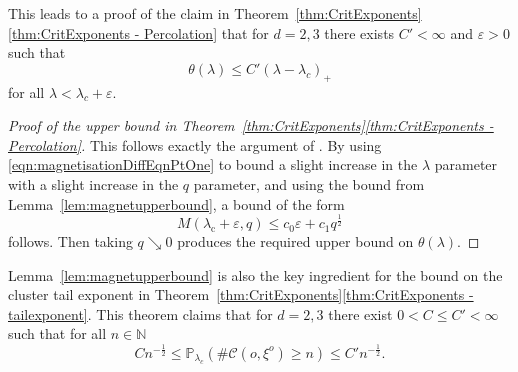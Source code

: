 \documentclass[10pt,a4paper,dvipsnames]{article}
\theoremstyle{definition}
\theoremstyle{remark}
\newcommand{\p}{\mathbb P}
\newcommand{\N}{\mathbb N}
\newcommand{\C}{\mathscr {C}}
\newcommand{\orig}{o}
\numberwithin{equation}{section}
\begin{document}
This leads to a proof of the claim in Theorem~\ref{thm:CritExponents}\ref{thm:CritExponents - Percolation} that for $d=2,3$ there exists $C'<\infty$ and $\varepsilon>0$ such that
\begin{equation}
    \theta\left(\lambda\right) \leq C'\left(\lambda-\lambda_c\right)_+
\end{equation}
for all $\lambda<\lambda_c+\varepsilon$.

\begin{proof}[Proof of the upper bound in Theorem~\ref{thm:CritExponents}\ref{thm:CritExponents - Percolation}]
    This follows exactly the argument of \cite[Section~4.2]{caicedo2023critical}. By using \eqref{eqn:magnetisationDiffEqnPtOne} to bound a slight increase in the $\lambda$ parameter with a slight increase in the $q$ parameter, and using the bound from Lemma~\ref{lem:magnetupperbound}, a bound of the form
    \begin{equation}
        M\left(\lambda_\mathrm{c}+\varepsilon,q\right) \leq c_0 \varepsilon + c_1q^\frac{1}{2}
    \end{equation}
    follows. Then taking $q\searrow 0$ produces the required upper bound on $\theta\left(\lambda\right)$.
\end{proof}

Lemma~\ref{lem:magnetupperbound} is also the key ingredient for the bound on the cluster tail exponent in Theorem~\ref{thm:CritExponents}\ref{thm:CritExponents - tailexponent}. 
This theorem claims that for $d=2,3$ there exist $0<C\leq C'<\infty$ such that for all $n\in\N$
\begin{equation}
        Cn^{-\frac{1}{2}}\leq \p_{\lambda_c}\left(\#\C\left(\orig,\xi^\orig\right)\geq n\right) \leq C'n^{-\frac{1}{2}}.
    \end{equation}
\end{document}

